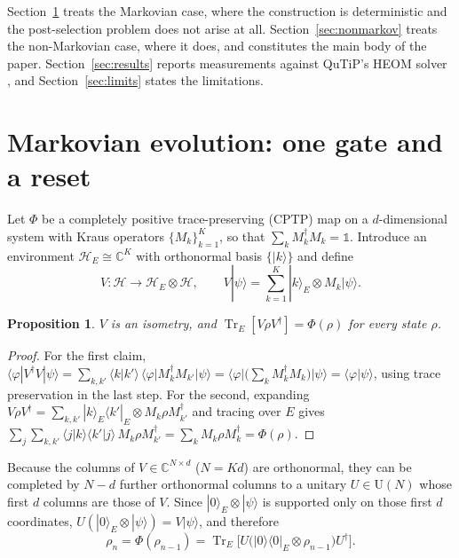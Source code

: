 \documentclass[aps,prx,twocolumn,superscriptaddress,nofootinbib,longbibliography]{revtex4-2}
\theoremstyle{plain}
\newtheorem{proposition}{Proposition}
\newcommand{\Tr}{\operatorname{Tr}}
\newcommand{\ket}[1]{|#1\rangle}
\newcommand{\bra}[1]{\langle#1|}
\newcommand{\adj}{^{\dagger}}
\begin{document}
Section~\ref{sec:markov} treats the Markovian case, where the construction is
deterministic and the post-selection problem does not arise at all.
Section~\ref{sec:nonmarkov} treats the non-Markovian case, where it does, and
constitutes the main body of the paper.  Section~\ref{sec:results} reports
measurements against QuTiP's HEOM solver \cite{Lambert2023,Johansson2013}, and
Section~\ref{sec:limits} states the limitations.

\section{Markovian evolution: one gate and a reset}
\label{sec:markov}

Let $\Phi$ be a completely positive trace-preserving (CPTP) map on a
$d$-dimensional system with Kraus operators $\{M_k\}_{k=1}^{K}$, so that
$\sum_k M_k\adj M_k = \mathbb 1$.  Introduce an environment
$\mathcal H_E\cong\mathbb C^{K}$ with orthonormal basis $\{\ket{k}\}$ and define
\begin{equation}
V:\mathcal H\to\mathcal H_E\otimes\mathcal H,\qquad
V\ket{\psi}=\sum_{k=1}^{K}\ket{k}_E\otimes M_k\ket{\psi}.
\label{eq:V}
\end{equation}

\begin{proposition}
$V$ is an isometry, and $\Tr_E[V\rho V\adj]=\Phi(\rho)$ for every state $\rho$.
\end{proposition}

\begin{proof}
For the first claim,
$\bra{\varphi}V\adj V\ket{\psi}
 =\sum_{k,k'}\langle k|k'\rangle\,\bra{\varphi}M_k\adj M_{k'}\ket{\psi}
 =\bra{\varphi}\big(\sum_k M_k\adj M_k\big)\ket{\psi}
 =\langle\varphi|\psi\rangle$,
using trace preservation in the last step.  For the second, expanding
$V\rho V\adj=\sum_{k,k'}\ket{k}_E\bra{k'}_E\otimes M_k\rho M_{k'}\adj$ and
tracing over $E$ gives
$\sum_j\sum_{k,k'}\langle j|k\rangle\langle k'|j\rangle\,M_k\rho M_{k'}\adj
 =\sum_k M_k\rho M_k\adj=\Phi(\rho)$.
\end{proof}

Because the columns of $V\in\mathbb C^{N\times d}$ ($N=Kd$) are orthonormal, they
can be completed by $N-d$ further orthonormal columns to a unitary
$U\in\mathrm U(N)$ whose first $d$ columns are those of $V$.  Since
$\ket{0}_E\otimes\ket{\psi}$ is supported only on those first $d$ coordinates,
$U(\ket{0}_E\otimes\ket{\psi})=V\ket{\psi}$, and therefore
\begin{equation}
\rho_n=\Phi(\rho_{n-1})
      =\Tr_E\!\Big[U\big(\ket{0}\bra{0}_E\otimes\rho_{n-1}\big)U\adj\Big].
\label{eq:stinespring-step}
\end{equation}
\end{document}
